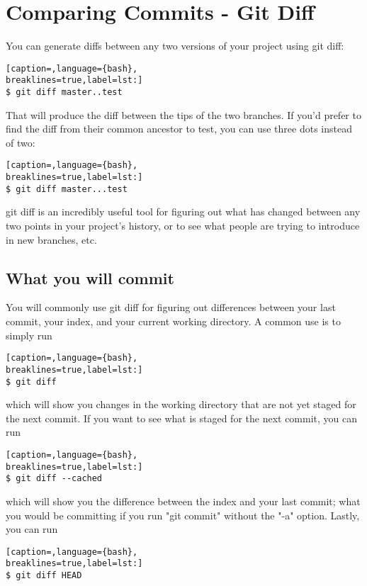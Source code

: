 \section{Comparing Commits - Git Diff}
You can generate diffs between any two versions of your project using git diff:
\lstset{basicstyle=\scriptsize, numbers=none, captionpos=b, tabsize=4}
\begin{lstlisting}[caption=,language={bash},
breaklines=true,label=lst:]
$ git diff master..test
\end{lstlisting}

That will produce the diff between the tips of the two branches. If you'd
prefer to find the diff from their common ancestor to test, you can use three
dots instead of two:
\lstset{basicstyle=\scriptsize, numbers=none, captionpos=b, tabsize=4}
\begin{lstlisting}[caption=,language={bash},
breaklines=true,label=lst:]
$ git diff master...test
\end{lstlisting}

git diff is an incredibly useful tool for figuring out what has changed between
any two points in your project's history, or to see what people are trying to
introduce in new branches, etc.

\subsection{What you will commit}

You will commonly use git diff for figuring out differences between your last
commit, your index, and your current working directory. A common use is to
simply run
\lstset{basicstyle=\scriptsize, numbers=none, captionpos=b, tabsize=4}
\begin{lstlisting}[caption=,language={bash},
breaklines=true,label=lst:]
$ git diff
\end{lstlisting}

which will show you changes in the working directory that are not yet staged
for the next commit. If you want to see what is staged for the next commit, you
can run
\lstset{basicstyle=\scriptsize, numbers=none, captionpos=b, tabsize=4}
\begin{lstlisting}[caption=,language={bash},
breaklines=true,label=lst:]
$ git diff --cached
\end{lstlisting}

which will show you the difference between the index and your last commit; what
you would be committing if you run "git commit" without the "-a" option.
Lastly, you can run
\lstset{basicstyle=\scriptsize, numbers=none, captionpos=b, tabsize=4}
\begin{lstlisting}[caption=,language={bash},
breaklines=true,label=lst:]
$ git diff HEAD
\end{lstlisting}

